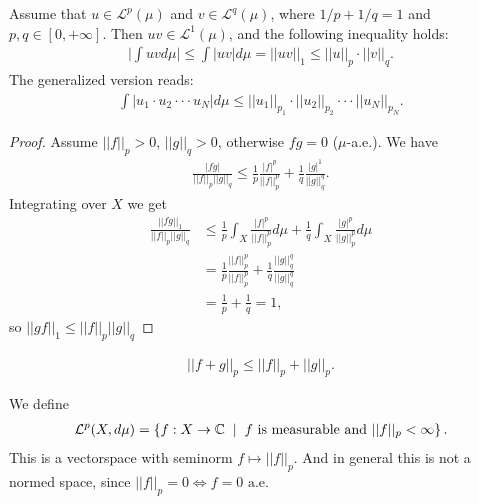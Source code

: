 \begin{theorem}
    Assume that \(u\in\mathcal{L}^p(\mu)\) and \(v\in\mathcal{L}^q(\mu)\), where \(1/p+1/q=1\) and \(p,q\in[0,+\infty]\). Then \(uv\in\mathcal{L}^1(\mu)\), and the following inequality holds:
    \begin{align*}
        \Big\vert \int uv d\mu \Big\vert \leq \int |uv| d\mu=||uv||_1 \leq||u||_p\cdot ||v||_q.
    \end{align*}
    The generalized version reads:
    \begin{align*}
        \int |u_1 \cdot u_2 \cdot \cdot \cdot u_N |d\mu \leq ||u_1||_{p_1}\cdot ||u_2||_{p_2} \cdot\cdot\cdot ||u_N||_{p_N}.
    \end{align*}
    
\end{theorem}
\ifdetailed
\begin{proof}
    Assume \(||f||_p>0\), \(||g||_q>0\), otherwise \(fg=0\) (\(\mu\)-a.e.). We have
    \begin{align*}
        \frac{|fg|}{||f||_p||g||_q} \leq \frac{1}{p}\frac{|f|^p}{||f||_{p}^{p}} + \frac{1}{q}\frac{|g|^1}{||g||_{q}^{q}}.
    \end{align*}
    Integrating over \(X\) we get 
    \begin{align*}
        \frac{||fg||_1}{||f||_p||g||_q} &\leq \frac{1}{p}\int_X \frac{|f|^p}{||f||_{p}^{p}}d\mu + \frac{1}{q}\int_X \frac{|g|^p}{||g||_{p}^{p}}d\mu \\ 
        &= \frac{1}{p}\frac{||f||_{p}^{p}}{||f||_{p}^{p}} + \frac{1}{q}\frac{||g||_{q}^{q}}{||g||_{q}^{q}} \\
        &= \frac{1}{p} + \frac{1}{q} = 1,
    \end{align*}
    so \(||gf||_1\leq ||f||_p||g||_q\)
\end{proof}
\fi
\begin{lemma}
    \begin{align}
        ||f+g||_p\leq ||f||_p+||g||_p.
    \end{align}
\end{lemma}

\begin{definition}
    We define
    \begin{align*}
        \mathcal L^p(X,d\mu) = \left\{ f:X\rightarrow \mathbb{C}\hspace{2mm} |\hspace{2mm} f\text{ is measurable and } ||f||_p<\infty \right\}. 
    \end{align*}
    This is a vectorspace with seminorm $f\mapsto ||f||_p.$
     And in general this is not a normed space, since $||f||_p=0 \iff f=0 \text{ a.e.}$
\end{definition}


